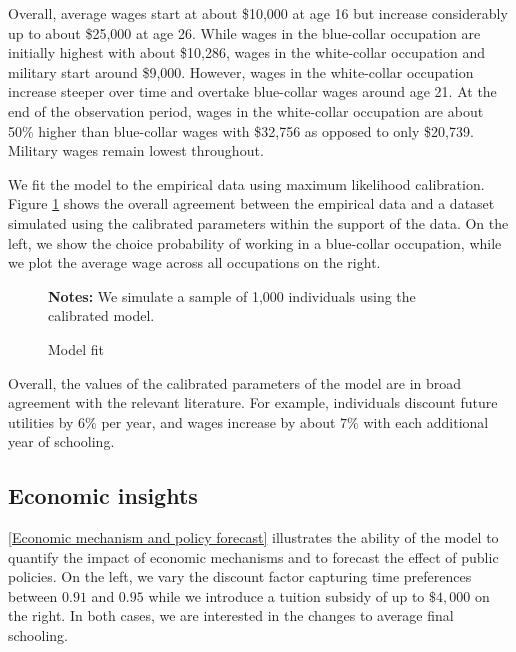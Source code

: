 Overall, average wages start at about \$10,000 at age 16 but increase considerably up to about \$25,000 at age 26. While wages in the blue-collar occupation are initially highest with about \$10,286, wages in the white-collar occupation and military start around \$9,000. However, wages in the white-collar occupation increase steeper over time and overtake blue-collar wages around age 21. At the end of the observation period, wages in the white-collar occupation are about 50\% higher than blue-collar wages with \$32,756 as opposed to only \$20,739. Military wages remain lowest throughout.

We fit the model to the empirical data using maximum likelihood calibration. Figure \ref{Model fit} shows the overall agreement between the empirical data and a dataset simulated using the calibrated parameters within the support of the data. On the left, we show the choice probability of working in a blue-collar occupation, while we plot the average wage across all occupations on the right.

%
\begin{figure}[t!]\centering
\caption{Model fit}\label{Model fit}
\hspace{0.3cm}
\begin{center}
\begin{minipage}[t]{0.7\columnwidth}
\item \scriptsize{\textbf{Notes:} We simulate a sample of 1,000 individuals using the calibrated model.}
\end{minipage}\end{center}
\end{figure}%
%

Overall, the values of the calibrated parameters of the model are in broad agreement with the relevant literature. For example, individuals discount future utilities by $6\%$ per year, and wages increase by about $7\%$ with each additional year of schooling.
\subsection{Economic insights}
\autoref{Economic mechanism and policy forecast} illustrates the ability of the model to quantify the impact of economic mechanisms and to forecast the effect of public policies. On the left, we vary the discount factor capturing time preferences between $0.91$ and $0.95$ while we introduce a tuition subsidy of up to $\$4{,}000$ on the right. In both cases, we are interested in the changes to average final schooling.

